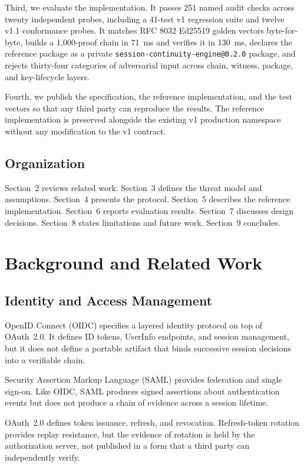 \documentclass[11pt,a4paper]{article}
\begin{document}
Third, we evaluate the implementation. It passes 251 named audit checks across twenty independent probes, including a 41-test v1 regression suite and twelve v1.1 conformance probes. It matches RFC 8032 Ed25519 golden vectors byte-for-byte, builds a 1{,}000-proof chain in 71~ms and verifies it in 130~ms, declares the reference package as a private \texttt{session-continuity-engine@0.2.0} package, and rejects thirty-four categories of adversarial input across chain, witness, package, and key-lifecycle layers.

Fourth, we publish the specification, the reference implementation, and the test vectors so that any third party can reproduce the results. The reference implementation is preserved alongside the existing v1 production namespace without any modification to the v1 contract.

\subsection{Organization}

Section~2 reviews related work. Section~3 defines the threat model and assumptions. Section~4 presents the protocol. Section~5 describes the reference implementation. Section~6 reports evaluation results. Section~7 discusses design decisions. Section~8 states limitations and future work. Section~9 concludes.

\section{Background and Related Work}

\subsection{Identity and Access Management}

OpenID Connect (OIDC) specifies a layered identity protocol on top of OAuth~2.0. It defines ID tokens, UserInfo endpoints, and session management, but it does not define a portable artifact that binds successive session decisions into a verifiable chain.

Security Assertion Markup Language (SAML) provides federation and single sign-on. Like OIDC, SAML produces signed assertions about authentication events but does not produce a chain of evidence across a session lifetime.

OAuth~2.0 defines token issuance, refresh, and revocation. Refresh-token rotation provides replay resistance, but the evidence of rotation is held by the authorization server, not published in a form that a third party can independently verify.
\end{document}
